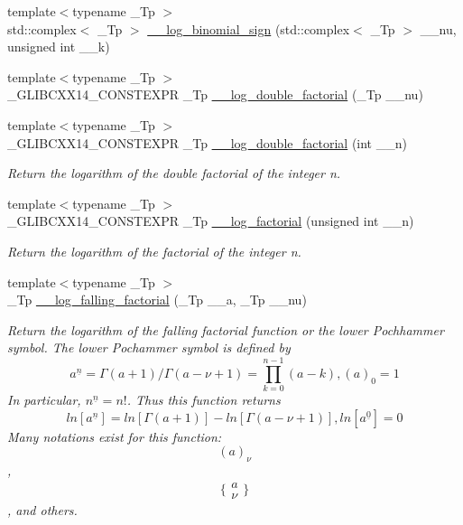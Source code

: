 \begin{DoxyCompactItemize}
{\footnotesize template$<$typename \+\_\+\+Tp $>$ }\\std\+::complex$<$ \+\_\+\+Tp $>$ \hyperlink{namespacestd_1_1____detail_ad73e7e0dfab6a4f54af026fa3d9e9c9a}{\+\_\+\+\_\+log\+\_\+binomial\+\_\+sign} (std\+::complex$<$ \+\_\+\+Tp $>$ \+\_\+\+\_\+nu, unsigned int \+\_\+\+\_\+k)
\item 
{\footnotesize template$<$typename \+\_\+\+Tp $>$ }\\\+\_\+\+G\+L\+I\+B\+C\+X\+X14\+\_\+\+C\+O\+N\+S\+T\+E\+X\+PR \+\_\+\+Tp \hyperlink{namespacestd_1_1____detail_ad7606a8224ac0c2256996b91051a48a5}{\+\_\+\+\_\+log\+\_\+double\+\_\+factorial} (\+\_\+\+Tp \+\_\+\+\_\+nu)
\item 
{\footnotesize template$<$typename \+\_\+\+Tp $>$ }\\\+\_\+\+G\+L\+I\+B\+C\+X\+X14\+\_\+\+C\+O\+N\+S\+T\+E\+X\+PR \+\_\+\+Tp \hyperlink{namespacestd_1_1____detail_aa832ed1d29fd41c40cf892cc1feef7e9}{\+\_\+\+\_\+log\+\_\+double\+\_\+factorial} (int \+\_\+\+\_\+n)
\begin{DoxyCompactList}\small\item\em Return the logarithm of the double factorial of the integer n. \end{DoxyCompactList}\item 
{\footnotesize template$<$typename \+\_\+\+Tp $>$ }\\\+\_\+\+G\+L\+I\+B\+C\+X\+X14\+\_\+\+C\+O\+N\+S\+T\+E\+X\+PR \+\_\+\+Tp \hyperlink{namespacestd_1_1____detail_a2809419dbbe9fc60066dacfdc13761d4}{\+\_\+\+\_\+log\+\_\+factorial} (unsigned int \+\_\+\+\_\+n)
\begin{DoxyCompactList}\small\item\em Return the logarithm of the factorial of the integer n. \end{DoxyCompactList}\item 
{\footnotesize template$<$typename \+\_\+\+Tp $>$ }\\\+\_\+\+Tp \hyperlink{namespacestd_1_1____detail_abc3aa91fde134d9f01be8fc8e7c7cc79}{\+\_\+\+\_\+log\+\_\+falling\+\_\+factorial} (\+\_\+\+Tp \+\_\+\+\_\+a, \+\_\+\+Tp \+\_\+\+\_\+nu)
\begin{DoxyCompactList}\small\item\em Return the logarithm of the falling factorial function or the lower Pochhammer symbol. The lower Pochammer symbol is defined by \[ a^{\underline{n}} = \Gamma(a + 1) / \Gamma(a - \nu + 1) = \prod_{k=0}^{n-1} (a - k), (a)_0 = 1 \] In particular, $ n^{\underline{n}} = n! $. Thus this function returns \[ ln[a^{\underline{n}}] = ln[\Gamma(a + 1)] - ln[\Gamma(a - \nu + 1)], ln[a^{\underline{0}}] = 0 \] Many notations exist for this function\+: \[ (a)_\nu \], \[ \{ \begin{array}{c} a \\ \nu \end{array} \} \], and others. \end{DoxyCompactList}\item 

\end{DoxyCompactItemize}
